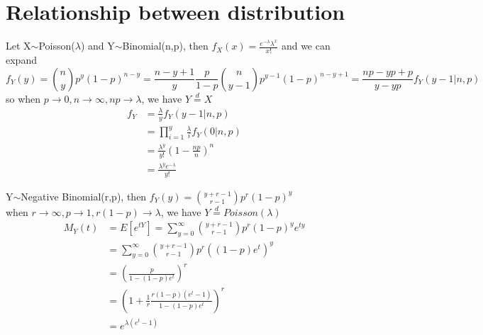 \documentclass[../Distributions.tex]{subfiles}
\begin{document}
\section{Relationship between distribution}
\begin{example}
Let X$\sim$Poisson($\lambda$) and Y$\sim$Binomial(n,p), then $f_X(x)=\frac{e^{-\lambda}\lambda^x}{x!}$ and we can expand $$f_Y(y)=\binom{n}{y}p^y(1-p)^{n-y}=\frac{n-y+1}{y}\frac{p}{1-p}\binom{n}{y-1}p^{y-1}(1-p)^{n-y+1}=\frac{np-yp+p}{y-yp}f_Y(y-1|n,p)$$ so when $p\rightarrow 0,n\rightarrow\infty,np\rightarrow\lambda$, we have $Y\overset{d}{=}X$
 \begin{align*}
f_Y&=\frac{\lambda}{y}f_Y(y-1|n,p)\\
&=\prod_{i=1}^y\frac{\lambda}{i}f_Y(0|n,p)\\
&=\frac{\lambda^y}{y!}(1-\frac{np}{n})^n\\
&=\frac{\lambda^ye^{-\lambda}}{y!}
\end{align*}
\end{example}
\begin{example}
Y$\sim$Negative Binomial(r,p), then $f_Y(y)=\binom{y+r-1}{r-1}p^r(1-p)^y$\\
when $r\rightarrow\infty,p\rightarrow 1,r(1-p)\rightarrow\lambda$, we have $Y\overset{d}{=} Poisson(\lambda)$
\begin{align*}
M_Y(t)&=E[e^{tY}]=\sum_{y=0}^\infty\binom{y+r-1}{r-1}p^r(1-p)^ye^{ty}\\
&=\sum_{y=0}^\infty\binom{y+r-1}{r-1}p^r((1-p)e^t)^y\\
&=(\frac{p}{1-(1-p)e^t})^r\\
&=(1+\frac{1}{r}\frac{r(1-p)(e^t-1)}{1-(1-p)e^t})^r\\
&=e^{\lambda(e^t-1)}
\end{align*}
\end{example}
\end{document}
